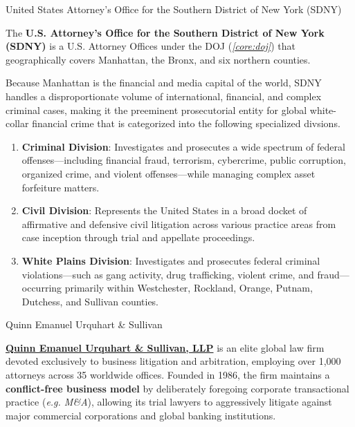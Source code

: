 \documentclass[10pt]{article}
\begin{document}
    \begin{core}[label=core:sdny]{United States Attorney’s Office for the Southern District of New York (SDNY)}

      The \textbf{U.S. Attorney's Office for the Southern District of New York (SDNY)} is a U.S. Attorney Offices under the DOJ (\textit{\autoref{core:doj}}) that geographically covers Manhattan, the Bronx, and six northern counties. 

      Because Manhattan is the financial and media capital of the world, SDNY handles a disproportionate volume of international, financial, and complex criminal cases, making it the preeminent prosecutorial entity for global white-collar financial crime that is categorized into the following specialized divsions.

      \begin{enumerate}

        \item \textbf{Criminal Division}: Investigates and prosecutes a wide spectrum of federal offenses---including financial fraud, terrorism, cybercrime, public corruption, organized crime, and violent offenses---while managing complex asset forfeiture matters.

        \item \textbf{Civil Division}: Represents the United States in a broad docket of affirmative and defensive civil litigation across various practice areas from case inception through trial and appellate proceedings.

        \item \textbf{White Plains Division}: Investigates and prosecutes federal criminal violations---such as gang activity, drug trafficking, violent crime, and fraud---occurring primarily within Westchester, Rockland, Orange, Putnam, Dutchess, and Sullivan counties.

      \end{enumerate}

    \end{core}

    \begin{core}{Quinn Emanuel Urquhart \& Sullivan}

      \href{https://www.quinnemanuel.com/}{\textbf{Quinn Emanuel Urquhart \& Sullivan, LLP}} is an elite global law firm devoted exclusively to business litigation and arbitration, employing over 1,000 attorneys across 35 worldwide offices. Founded in 1986, the firm maintains a \textbf{conflict-free business model} by deliberately foregoing corporate transactional practice (\textit{e.g. M\&A}), allowing its trial lawyers to aggressively litigate against major commercial corporations and global banking institutions.

    \end{core}
\end{document}
